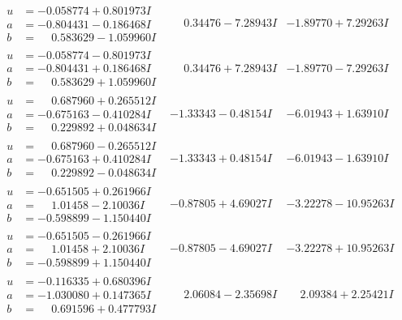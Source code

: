 \documentclass[1p]{elsarticle_modified}
\theoremstyle{definition}
\begin{document}
$$\begin{array}{c|c|c}
\begin{aligned}
u &= -0.058774 + 0.801973 I \\
a &= -0.804431 - 0.186468 I \\
b &= \phantom{-}0.583629 - 1.059960 I\end{aligned}
 & \phantom{-}0.34476 - 7.28943 I & -1.89770 + 7.29263 I \\ \hline\begin{aligned}
u &= -0.058774 - 0.801973 I \\
a &= -0.804431 + 0.186468 I \\
b &= \phantom{-}0.583629 + 1.059960 I\end{aligned}
 & \phantom{-}0.34476 + 7.28943 I & -1.89770 - 7.29263 I \\ \hline\begin{aligned}
u &= \phantom{-}0.687960 + 0.265512 I \\
a &= -0.675163 - 0.410284 I \\
b &= \phantom{-}0.229892 + 0.048634 I\end{aligned}
 & -1.33343 - 0.48154 I & -6.01943 + 1.63910 I \\ \hline\begin{aligned}
u &= \phantom{-}0.687960 - 0.265512 I \\
a &= -0.675163 + 0.410284 I \\
b &= \phantom{-}0.229892 - 0.048634 I\end{aligned}
 & -1.33343 + 0.48154 I & -6.01943 - 1.63910 I \\ \hline\begin{aligned}
u &= -0.651505 + 0.261966 I \\
a &= \phantom{-}1.01458 - 2.10036 I \\
b &= -0.598899 - 1.150440 I\end{aligned}
 & -0.87805 + 4.69027 I & -3.22278 - 10.95263 I \\ \hline\begin{aligned}
u &= -0.651505 - 0.261966 I \\
a &= \phantom{-}1.01458 + 2.10036 I \\
b &= -0.598899 + 1.150440 I\end{aligned}
 & -0.87805 - 4.69027 I & -3.22278 + 10.95263 I \\ \hline\begin{aligned}
u &= -0.116335 + 0.680396 I \\
a &= -1.030080 + 0.147365 I \\
b &= \phantom{-}0.691596 + 0.477793 I\end{aligned}
 & \phantom{-}2.06084 - 2.35698 I & \phantom{-}2.09384 + 2.25421 I \\ \hline\begin{aligned}

\end{aligned}
\end{array}$$
\end{document}
